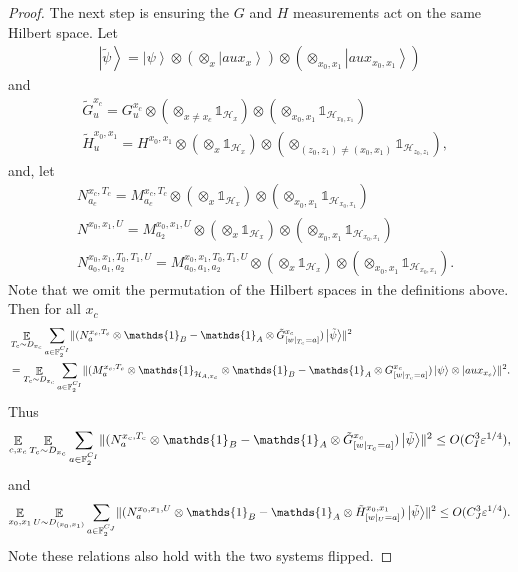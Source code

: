 \documentclass[11pt]{article}
\theoremstyle{plain}
\theoremstyle{definition}
\DeclarePairedDelimiter{\norm}{\lVert}{\rVert}
\newcommand {\ket} [1] {\ensuremath{ \left| #1 \right\rangle }}
\DeclareMathOperator*{\bigE}{\mathbb{E}}
\newcommand {\id} {\ensuremath{\mathds{1}}}
\newcommand{\ep} {\ensuremath{\varepsilon}}
\newcommand{\x}{\otimes}
\newcommand{\calH}{\mathcal{H}}
\newcommand{\1}{\mathbb{1}} %
\newcommand{\bF}{\mathbb{F}}
\newcommand{\tG}{\tilde{G}}
\newcommand{\tH}{\tilde{H}}
\newcommand{\tpsi}{\tilde{\psi}}
\begin{document}
\begin{proof}
The next step is ensuring the $G$ and $H$ measurements act on the same Hilbert space.
Let 
\begin{align*}
\ket{\tpsi} = \ket{\psi} \x (\x_{x} \ket{aux_{x}}) \x (\x_{x_0,x_1} \ket{aux_{x_0,x_1}})
\end{align*}
and
\begin{align*}
	&\tG^{x_c}_u = G^{x_c}_u \x (\x_{x \neq x_c} \id_{\calH_{x}}) \x (\x_{x_0,x_1} \id_{\calH_{x_0,x_1}}) \\
	&\tH^{x_0,x_1}_u = H^{x_0,x_1} \x (\x_x \id_{\calH_x}) \x (\x_{(z_0,z_1) \neq (x_0,x_1)} \id_{\calH_{z_0,z_1}}),
\end{align*}
and, let 
\begin{align*}
	&N^{x_c, T_c}_{a_c}  = M^{x_c, T_c}_{a_c} \x (\x_x \id_{\calH_x}) \x (\x_{x_0,x_1} \id_{\calH_{x_0,x_1}}) \\
	&N^{x_0, x_1, U} = M^{x_0, x_1, U}_{a_2}  \x (\x_x \id_{\calH_x}) \x (\x_{x_0,x_1} \id_{\calH_{x_0,x_1}}) \\
	&N^{x_0, x_1, T_0, T_1, U}_{a_0,a_1,a_2} = M^{x_0, x_1, T_0, T_1, U}_{a_0,a_1,a_2} \x  (\x_x \id_{\calH_x}) \x (\x_{x_0,x_1} \id_{\calH_{x_0,x_1}}). 
\end{align*}
Note that we omit the permutation of the Hilbert spaces in the definitions above.
Then for all $x_c$
\begin{align*}
	&\bigE_{T_c \sim D_{x_c}} \sum_{a \in \bF_2^{C_I}} \norm{  (N^{x_c, T_c}_a  \x \id_B -\id_A \x \tG^{x_c}_{[w|_{T_c} =a]})\ket{\tpsi}}^2\\
	&=
	\bigE_{T_c \sim D_{x_c}} \sum_{a \in \bF_2^{C_I}} \norm{  (M^{x_c, T_c}_a \x \id_{\calH_{A, x_c}} \x \id_B -\id_A \x G^{x_c}_{[w|_{T_c} =a]})\ket{\psi} \x \ket{aux_{x_c}}}^2.
\end{align*}
Thus
\begin{align}
	\label{eq:N_to_G}
	\bigE_{c,x_c}\bigE_{T_c \sim D_{x_c}} \sum_{a \in \bF_2^{C_I}} \norm{  (N^{x_c, T_c}_a \x \id_B -\id_A \x \tG^{x_c}_{[w|_{T_c} =a]})\ket{\tpsi}}^2 \leq O(C_I^3\ep^{1/4}),
\end{align}
and
\begin{align}
	\label{eq:N_to_H}
	\bigE_{x_0,x_1} \bigE_{U \sim D_{(x_0,x_1)}} \sum_{a \in \bF_2^{C_J}} \norm{  (N^{x_0,x_1, U}_a \x \id_B -\id_A \x \tH^{x_0,x_1}_{[w|_{U} =a]})\ket{\tpsi}}^2 \leq O(C_J^3\ep^{1/4}).
\end{align}
Note these relations also hold with the two systems flipped. 


\end{proof}
\end{document}
